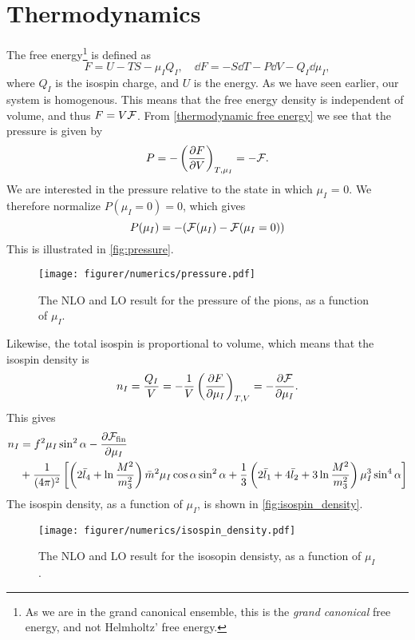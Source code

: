 \section{Thermodynamics}
The free energy\footnote{As we are in the grand canonical ensemble, this is the \emph{grand canonical} free energy, and not Helmholtz' free energy.}
is defined as
\begin{equation}
    \label{thermodynamic free energy}
    F = U - TS - \mu_I Q_I, \quad \dd F = - S \dd T - P \dd V - Q_I \dd \mu_I ,
\end{equation}
where $Q_I$ is the isospin charge, and $U$ is the energy.
As we have seen earlier, our system is homogenous.
This means that the free energy density is independent of volume, and thus $F = V \mathcal{F}$.
From  \cref{thermodynamic free energy} we see that the pressure is given by
\begin{equation}
    P = - \left(\diffp{F}{V}\right)_{T, \mu_I} = - \Ef.
\end{equation}
We are interested in the pressure relative to the state in which $\mu_I$ = 0. We therefore normalize $P(\mu_I=0) = 0$, which gives  
\begin{equation}
    P(\mu_I) = -(\mathcal{F}(\mu_I) - \mathcal{F}(\mu_I = 0))
\end{equation}
This is illustrated in \autoref{fig:pressure}.
\begin{figure}[h]
    \centering
    \vspace{-0.2cm}
    \texttt{[image: figurer/numerics/pressure.pdf]}
    \caption{The NLO and LO result for the pressure of the pions, as a function of $\mu_I$.}
    \label{fig:pressure}
\end{figure}

Likewise, the total isospin is proportional to volume, which means that the isospin density is
\begin{equation}
    n_I = \frac{Q_I}{V} = - \frac{1}{V} \left(\diffp{F}{\mu_I}\right)_{T, V}
    = - \diffp{\Ef}{\mu_I}.
\end{equation}
This gives 
\begin{align}
    \nonumber
    n_I & = 
    f^2 \mu_I \sin^2 \alpha
    - \diffp{\Ef_\mathrm{fin}}{\mu_I} \\
    & + \frac{1}{(4 \pi)^2}
    \left[
            \left(2\bar l_4+\ln\frac{M^2}{m_3^2}\right)\bar m^2 \mu_I \cos\alpha \sin^2 \alpha
            +\frac{1}{3}\left(2\bar l_1 + 4 \bar l_2 + 3\ln\frac{M^2}{m_3^2}\right)\mu_I^3 \sin^4 \alpha
    \right]
\end{align}
The isospin density, as a function of $\mu_I$, is shown in \autoref{fig:isospin_density}.
\begin{figure}[!h]
    \centering
    \vspace{-0.2cm}
    \texttt{[image: figurer/numerics/isospin\_density.pdf]}
    \caption{The NLO and LO result for the isosopin densisty, as a function of $\mu_I$.}
    \label{fig:isospin_density}
\end{figure}

